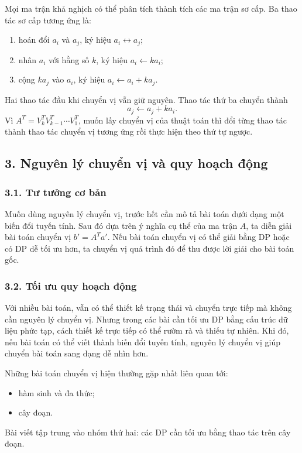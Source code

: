 \documentclass[11pt]{article}
\begin{document}
Mọi ma trận khả nghịch có thể phân tích thành tích các ma trận sơ cấp. Ba thao
tác sơ cấp tương ứng là:
\begin{enumerate}
  \item hoán đổi \(a_i\) và \(a_j\), ký hiệu \(a_i\leftrightarrow a_j\);
  \item nhân \(a_i\) với hằng số \(k\), ký hiệu \(a_i\leftarrow k a_i\);
  \item cộng \(k a_j\) vào \(a_i\), ký hiệu
  \(a_i\leftarrow a_i+k a_j\).
\end{enumerate}
Hai thao tác đầu khi chuyển vị vẫn giữ nguyên. Thao tác thứ ba chuyển thành
\[
  a_j\leftarrow a_j+k a_i.
\]
Vì \(A^T=V_k^T V_{k-1}^T\cdots V_1^T\), muốn lấy chuyển vị của thuật toán thì
đổi từng thao tác thành thao tác chuyển vị tương ứng rồi thực hiện theo thứ tự
ngược.

\subsection*{3. Nguyên lý chuyển vị và quy hoạch động}

\subsubsection*{3.1. Tư tưởng cơ bản}

Muốn dùng nguyên lý chuyển vị, trước hết cần mô tả bài toán dưới dạng một biến
đổi tuyến tính. Sau đó dựa trên ý nghĩa cụ thể của ma trận \(A\), ta diễn giải
bài toán chuyển vị \(b'=A^T a'\). Nếu bài toán chuyển vị có thể giải bằng DP
hoặc có DP dễ tối ưu hơn, ta chuyển vị quá trình đó để thu được lời giải cho
bài toán gốc.

\subsubsection*{3.2. Tối ưu quy hoạch động}

Với nhiều bài toán, vẫn có thể thiết kế trạng thái và chuyển trực tiếp mà không
cần nguyên lý chuyển vị. Nhưng trong các bài cần tối ưu DP bằng cấu trúc dữ
liệu phức tạp, cách thiết kế trực tiếp có thể rườm rà và thiếu tự nhiên. Khi
đó, nếu bài toán có thể viết thành biến đổi tuyến tính, nguyên lý chuyển vị
giúp chuyển bài toán sang dạng dễ nhìn hơn.

Những bài toán chuyển vị hiện thường gặp nhất liên quan tới:
\begin{itemize}
  \item hàm sinh và đa thức;
  \item cây đoạn.
\end{itemize}
Bài viết tập trung vào nhóm thứ hai: các DP cần tối ưu bằng thao tác trên cây
đoạn.
\end{document}
